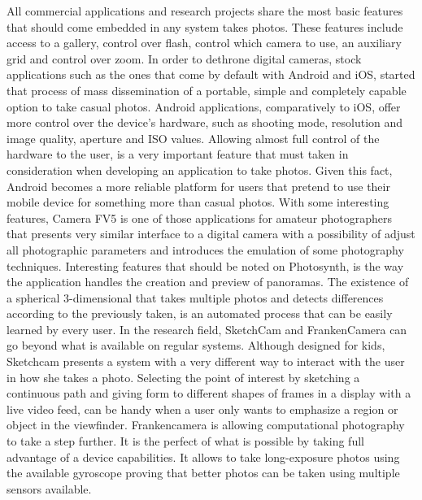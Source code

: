 All commercial applications and research projects share the most basic features that should come embedded in any system takes photos. These features include access to a gallery, control over flash, control which camera to use, an auxiliary grid and control over zoom.
In order to dethrone digital cameras, stock applications such as the ones that come by default with Android and iOS, started that process of mass dissemination of a portable, simple and completely capable option to take casual photos. 
Android applications, comparatively to iOS, offer more control over the device’s hardware, such as shooting mode, resolution and image quality, aperture and ISO values. Allowing almost full control of the hardware to the user, is a very important feature that must taken in consideration when developing an application to take photos. Given this fact, Android becomes a more reliable platform for users that pretend to use their mobile device for something more than casual photos.
With some interesting features, Camera FV5  is one of those applications for amateur photographers that presents very similar interface to a digital camera with a possibility of adjust all photographic parameters and introduces the emulation of some photography techniques.
Interesting features that should be noted on Photosynth, is the way the application handles the creation and preview of panoramas. The existence of a spherical 3-dimensional that takes multiple photos and detects differences according to the previously taken, is an automated process that can be easily learned by every user.
In the research field, SketchCam and FrankenCamera can go beyond what is available on regular systems. Although designed for kids, Sketchcam presents a system with a very different way to interact with the user in how she takes a photo. Selecting the point of interest by sketching a continuous path and giving form to different shapes of frames in a display with a live video feed, can be handy when a user only wants to emphasize a region or object in the viewfinder.
Frankencamera is allowing computational photography to take a step further. It is the perfect of what is possible by taking full advantage of a device capabilities. It allows to take long-exposure photos using the available gyroscope proving that better photos can be taken using multiple sensors available.


